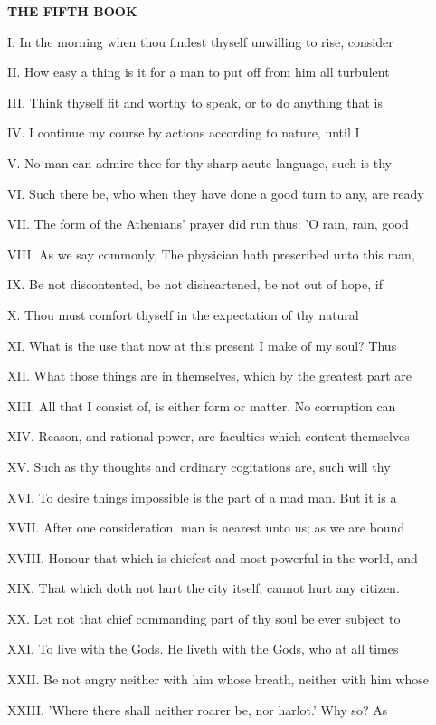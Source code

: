 \textbf{THE FIFTH BOOK}

I. In the morning when thou findest thyself
unwilling to rise, consider

II. How easy a thing is it for a man to put
off from him all turbulent

III. Think thyself fit and worthy to speak, or
to do anything that is

IV. I continue my course by actions according
to nature, until I

V. No man can admire thee for thy sharp acute
language, such is thy

VI. Such there be, who when they have done a
good turn to any, are ready

VII. The form of the Athenians' prayer did run
thus: 'O rain, rain, good

VIII. As we say commonly, The physician hath
prescribed unto this man,

IX. Be not discontented, be not disheartened,
be not out of hope, if

X. Thou must comfort thyself in the
expectation of thy natural

XI. What is the use that now at this present I
make of my soul? Thus

XII. What those things are in themselves,
which by the greatest part are

XIII. All that I consist of, is either form or
matter. No corruption can

XIV. Reason, and rational power, are faculties
which content themselves

XV. Such as thy thoughts and ordinary
cogitations are, such will thy

XVI. To desire things impossible is the part
of a mad man. But it is a

XVII. After one consideration, man is nearest
unto us; as we are bound

XVIII. Honour that which is chiefest and most
powerful in the world, and

XIX. That which doth not hurt the city itself;
cannot hurt any citizen.

XX. Let not that chief commanding part of thy
soul be ever subject to

XXI. To live with the Gods. He liveth with the
Gods, who at all times

XXII. Be not angry neither with him whose
breath, neither with him whose

XXIII. 'Where there shall neither roarer be,
nor harlot.' Why so? As

